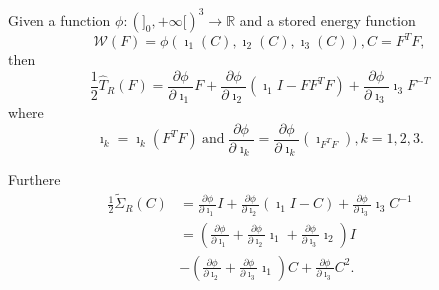 \begin{theorem}\label{chap1-thm1.4.6} %
Given a function $\phi : ( ]_{0}, + \infty [ )^{3} \to \mathbb{R}$ and
    a stored energy function 
$$
\mathcal{W}(F) = \phi (\imath_{1}(C), \imath_{2} (C) , \imath_{3}(C))
, C = F^{T}F,  
$$
then 
\begin{equation*}
\frac{1}{2} \hat{T}_{R}(F) = \frac{\partial \phi}{\partial \imath_{1}} F +
\frac{\partial \phi}{\partial \imath_{2}} (\imath_{1} I - FF^{T}F) +
\frac{\partial \phi}{\partial \imath_{3}} \imath_{3}
F^{-T}\tag{1.4-28} \label{eq1.4-28} 
\end{equation*}\pageoriginale
where 
$$
\imath_{k} = \imath_{k}(F^{T}F) ~\text{and}~\frac{\partial \phi}{\partial \imath_{k}}
= \frac{\partial \phi}{\partial \imath_{k}}(\imath_{F^{T}F}), k = 1,2,3. 
$$

Furthere
\begin{align*}
  \frac{1}{2} \tilde{\Sigma}_{R}(C) & = \frac{\partial \phi}{\partial
    \imath_{1}} I + \frac{\partial \phi}{\partial \imath_{2}}
  (\imath_{1}I - C) + 
  \frac{\partial \phi}{\partial \imath_{3}} \imath_{3}C^{-1}
  \tag{1.4-29}\label{eq1.4-29}\\  
  &= \left(\frac{\partial \phi}{\partial \imath_{1}} + \frac{\partial
    \phi}{\partial \imath_{2}} \imath_{1} + \frac{\partial \phi}{\partial
    \imath_{3}}\imath_{2}\right) I\\ 
  & - \left(\frac{\partial \phi}{\partial \imath_{2}} + \frac{\partial
    \phi}{\partial \imath_{3}}\imath_{1}\right)C + \frac{\partial \phi}{\partial
    \imath_{3}}C^{2}. 
\end{align*}
\end{theorem}

